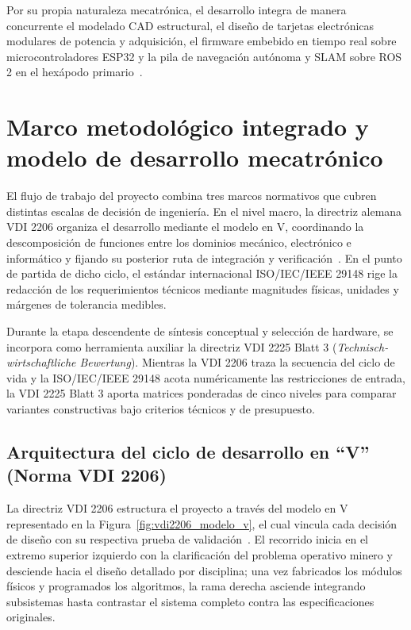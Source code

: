 Por su propia naturaleza mecatrónica, el desarrollo integra de manera concurrente el modelado CAD estructural, el diseño de tarjetas electrónicas modulares de potencia y adquisición, el firmware embebido en tiempo real sobre microcontroladores ESP32 y la pila de navegación autónoma y SLAM sobre ROS 2 en el hexápodo primario~\cite{VDI2206_2004}.


\section{Marco metodológico integrado y modelo de desarrollo mecatrónico}

El flujo de trabajo del proyecto combina tres marcos normativos que cubren distintas escalas de decisión de ingeniería. En el nivel macro, la directriz alemana VDI 2206 organiza el desarrollo mediante el modelo en V, coordinando la descomposición de funciones entre los dominios mecánico, electrónico e informático y fijando su posterior ruta de integración y verificación~\cite{VDI2206_2004}. En el punto de partida de dicho ciclo, el estándar internacional ISO/IEC/IEEE 29148 rige la redacción de los requerimientos técnicos mediante magnitudes físicas, unidades y márgenes de tolerancia medibles.

Durante la etapa descendente de síntesis conceptual y selección de hardware, se incorpora como herramienta auxiliar la directriz VDI 2225 Blatt 3 (\textit{Technisch-wirtschaftliche Bewertung}). Mientras la VDI 2206 traza la secuencia del ciclo de vida y la ISO/IEC/IEEE 29148 acota numéricamente las restricciones de entrada, la VDI 2225 Blatt 3 aporta matrices ponderadas de cinco niveles para comparar variantes constructivas bajo criterios técnicos y de presupuesto.

\subsection{Arquitectura del ciclo de desarrollo en ``V'' (Norma VDI 2206)}

La directriz VDI 2206 estructura el proyecto a través del modelo en V representado en la Figura~\ref{fig:vdi2206_modelo_v}, el cual vincula cada decisión de diseño con su respectiva prueba de validación~\cite{VDI2206_2004}. El recorrido inicia en el extremo superior izquierdo con la clarificación del problema operativo minero y desciende hacia el diseño detallado por disciplina; una vez fabricados los módulos físicos y programados los algoritmos, la rama derecha asciende integrando subsistemas hasta contrastar el sistema completo contra las especificaciones originales.

